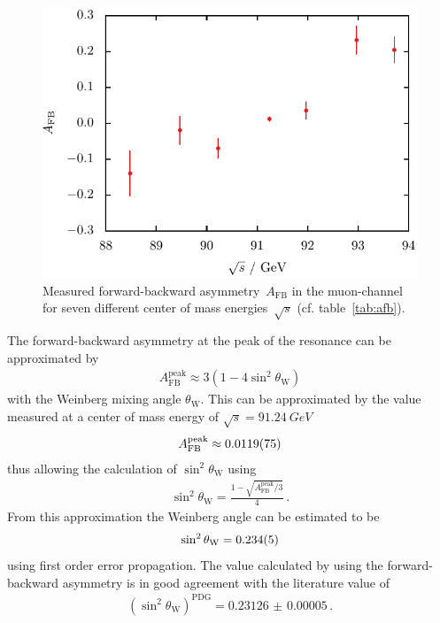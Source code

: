\documentclass[11pt, a4paper]{article}
\numberwithin{equation}{section}
\begin{document}
\begin{figure}[h]
	\centering
	\includegraphics{./figures/afb.pdf}
	\caption{Measured forward-backward asymmetry~$A_\mathrm{FB}$ in the muon-channel for seven different center of mass energies~$\sqrt{s}$ (cf. table~\ref{tab:afb}).}
\end{figure}


The forward-backward asymmetry at the peak of the resonance can be approximated by \cite{instructions}
\begin{align*}
	A_\mathrm{FB}^\mathrm{peak} \approx 3 \left( 1 - 4 \sin^2\theta_\mathrm{W} \right)
\end{align*}
with the Weinberg mixing angle $\theta_\mathrm{W}$.
This can be approximated by the value measured at a center of mass energy of $\sqrt{s} = \SI{91.24}{GeV}$
\begin{align*}
	A_\mathrm{FB}^\mathrm{peak} \approx \num{0.0119 +- 0.0075}
\end{align*}
thus allowing the calculation of $\sin^2\theta_\mathrm{W}$ using
\begin{align*}
	\sin^2\theta_\mathrm{W} = \frac{1 - \sqrt{A_\mathrm{FB}^\mathrm{peak} / 3}}{4} \,\text{.}
\end{align*}
From this approximation the Weinberg angle can be estimated to be
\begin{align*}
	\sin^2\theta_\mathrm{W} = \num{0.234 +- 0.005}
\end{align*}
using first order error propagation.
The value calculated by using the forward-backward asymmetry is in good agreement with the literature value of \cite{pdg}
\begin{align*}
	(\sin^2\theta_\mathrm{W})^\mathrm{PDG} = \num{0.23126(5)} \,\text{.}
\end{align*}
\end{document}
